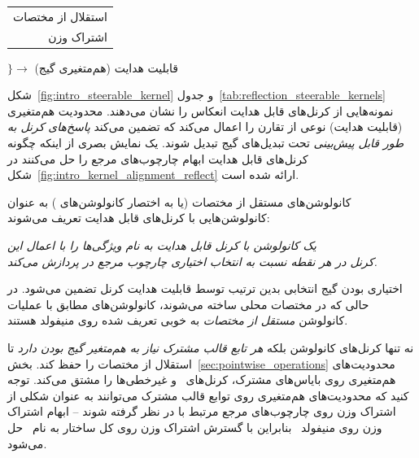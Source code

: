 \begin{center}
	\begin{tabular}{r@{}}
		استقلال از مختصات \lr{$\mathcal{G}M$} \\[4pt]
		اشتراک وزن
	\end{tabular}
	$\Bigg\} \longrightarrow$ قابلیت هدایت  (هم‌متغیری گیج)
\end{center}
شکل~\ref{fig:intro_steerable_kernel} و جدول~\ref{tab:reflection_steerable_kernels} نمونه‌هایی از کرنل‌های قابل هدایت انعکاس را نشان می‌دهند.
محدودیت هم‌متغیری (قابلیت هدایت) نوعی از تقارن  را اعمال می‌کند که تضمین می‌کند \emph{پاسخ‌های کرنل به طور قابل پیش‌بینی} تحت تبدیل‌های گیج تبدیل شوند.
یک نمایش بصری از اینکه چگونه کرنل‌های قابل هدایت  ابهام چارچوب‌های مرجع را حل می‌کنند در شکل~\ref{fig:intro_kernel_alignment_reflect} ارائه شده است.


\begin{samepage}
	کانولوشن‌های مستقل از مختصات \lr{$\GM$} (یا به اختصار کانولوشن‌های \lr{$\GM$})
	{\setlength{\marginparwidth}{2.5cm}%
		}%
	به عنوان کانولوشن‌هایی با کرنل‌های قابل هدایت  تعریف می‌شوند:
	\begin{center}\it
		یک کانولوشن \lr{$\GM$} با کرنل قابل هدایت  به نام  ویژگی‌ها را با اعمال این \\
		کرنل در هر نقطه  نسبت به انتخاب اختیاری چارچوب مرجع در \lr{$\GpM$} پردازش می‌کند. \\
	\end{center}
\end{samepage}
اختیاری بودن گیج انتخابی بدین ترتیب توسط قابلیت هدایت  کرنل تضمین می‌شود.
در حالی که در مختصات محلی ساخته می‌شوند، 
کانولوشن‌های \lr{$\GM$} مطابق با عملیات کانولوشن \emph{مستقل از مختصات} به خوبی تعریف شده روی منیفولد هستند.


نه تنها کرنل‌های کانولوشن بلکه \emph{هر تابع قالب مشترک نیاز به هم‌متغیر گیج بودن دارد} تا استقلال از مختصات \lr{$\GM$} را حفظ کند.
بخش~\ref{sec:pointwise_operations} محدودیت‌های هم‌متغیری روی بایاس‌های مشترک، کرنل‌های \onexone\ و غیرخطی‌ها را مشتق می‌کند.
توجه کنید که محدودیت‌های هم‌متغیری روی توابع قالب مشترک می‌توانند به عنوان شکلی از اشتراک وزن روی چارچوب‌های مرجع مرتبط با  در نظر گرفته شوند
-- ابهام اشتراک وزن روی منیفولد~ بنابراین با گسترش اشتراک وزن روی کل ساختار  به نام~\lr{$\GM$} حل می‌شود.



